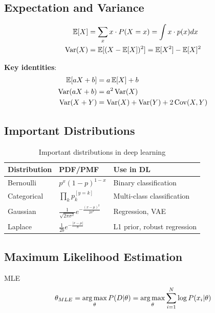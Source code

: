 \subsection{Expectation and Variance}

\begin{align}
\operatorname{\mathbb{E}}[X] &= \sum_x x \cdot P(X=x) = \int x \cdot p(x) dx \\
\operatorname{Var}(X) &= \operatorname{\mathbb{E}}[(X - \operatorname{\mathbb{E}}[X])^2] = \operatorname{\mathbb{E}}[X^2] - \operatorname{\mathbb{E}}[X]^2
\end{align}

\textbf{Key identities}:
\begin{align}
\operatorname{\mathbb{E}}[aX + b] &= a\operatorname{\mathbb{E}}[X] + b \\
\operatorname{Var}(aX + b) &= a^2 \operatorname{Var}(X) \\
\operatorname{Var}(X + Y) &= \operatorname{Var}(X) + \operatorname{Var}(Y) + 2\operatorname{Cov}(X,Y)
\end{align}

\subsection{Important Distributions}

\begin{table}[H]
\centering
\caption{Important distributions in deep learning}
\begin{tabularx}{\textwidth}{lXX}
\toprule
\textbf{Distribution} & \textbf{PDF/PMF} & \textbf{Use in DL} \\
\midrule
Bernoulli & $p^x(1-p)^{1-x}$ & Binary classification \\
Categorical & $\prod_k p_k^{[y=k]}$ & Multi-class classification \\
Gaussian & $\frac{1}{\sqrt{2\pi\sigma^2}}e^{-\frac{(x-\mu)^2}{2\sigma^2}}$ & Regression, VAE \\
Laplace & $\frac{1}{2b}e^{-\frac{|x-\mu|}{b}}$ & L1 prior, robust regression \\
\bottomrule
\end{tabularx}
\end{table}

\subsection{Maximum Likelihood Estimation}

\begin{mathresult}{MLE}
\begin{equation}
\theta_{MLE} = \operatorname*{arg\,max}_\theta P(D|\theta) = \operatorname*{arg\,max}_\theta \sum_{i=1}^N \log P(x_i|\theta)
\end{equation}
\end{mathresult}

